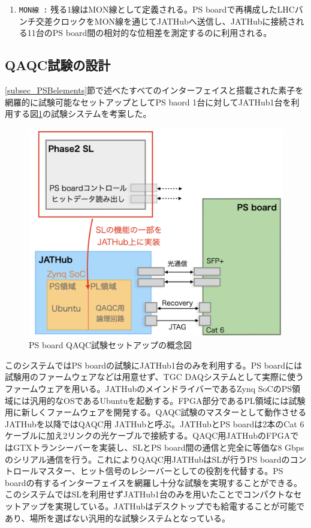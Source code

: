 \begin{enumerate}
    \item \texttt{MON線 :} 残る1線はMON線として定義される。PS boardで再構成したLHCバンチ交差クロックをMON線を通じてJATHubへ送信し、JATHubに接続される11台のPS board間の相対的な位相差を測定するのに利用される。
    \baselineskip
\end{enumerate}

\subsection{QAQC試験の設計}
\label{subsec_QAQCdesign}
\ref{subsec_PSBelements}節で述べたすべてのインターフェイスと搭載された素子を網羅的に試験可能なセットアップとしてPS baord 1台に対してJATHub1台を利用する図\ref{PSBtestdesign}の試験システムを考案した。

\begin{figure} 
\centering
\includegraphics[width=16cm]{fig/PSBtestdesign.png}
\caption[PS board QAQC試験セットアップの概念図]{PS board QAQC試験セットアップの概念図}
\label{PSBtestdesign}
\end{figure}

このシステムではPS boardの試験にJATHub1台のみを利用する。PS boardには試験用のファームウェアなどは用意せず、TGC DAQシステムとして実際に使うファームウェアを用いる。JATHubのメインドライバーであるZynq SoCのPS領域には汎用的なOSであるUbuntuを起動する。FPGA部分であるPL領域には試験用に新しくファームウェアを開発する。QAQC試験のマスターとして動作させるJATHubを以降ではQAQC用 JATHubと呼ぶ。JATHubとPS boardは2本のCat 6ケーブルに加え2リンクの光ケーブルで接続する。QAQC用JATHubのFPGAではGTXトランシーバーを実装し、SLとPS board間の通信と完全に等価な8 Gbpsのシリアル通信を行う。これによりQAQC用JATHubはSLが行うPS boardのコントロールマスター、ヒット信号のレシーバーとしての役割を代替する。PS boardの有するインターフェイスを網羅し十分な試験を実現することができる。このシステムではSLを利用せずJATHub1台のみを用いたことでコンパクトなセットアップを実現している。JATHubはデスクトップでも給電することが可能であり、場所を選ばない汎用的な試験システムとなっている。\par

